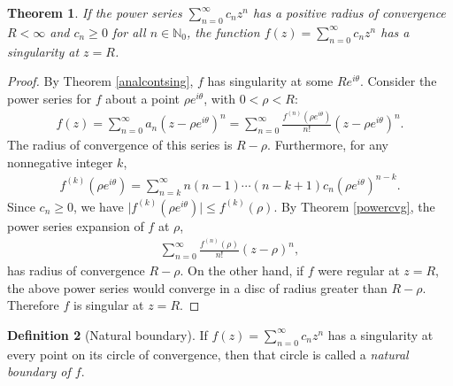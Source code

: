 \documentclass{article}
\numberwithin{equation}{section}
\newcommand{\bbN}{\mathbb{N}}
\theoremstyle{plain}
\newtheorem{theorem}{Theorem}[section]
\theoremstyle{definition}
\newtheorem{definition}[theorem]{Definition}
\begin{document}
\begin{theorem}
If the power series $\sum_{n=0}^\infty c_nz^n$ has a positive radius of convergence $R<\infty$ and $c_n\geq 0$ for all $n\in\bbN_0$, the function $f(z)=\sum_{n=0}^\infty c_nz^n$ has a singularity at $z=R$.
\end{theorem}
\begin{proof}
By Theorem \ref{analcontsing}, $f$ has singularity at some $Re^{i\theta}$. Consider the power series for $f$ about a point $\rho e^{i\theta}$, with $0<\rho<R$:
\begin{align*}
	f(z)=\sum_{n=0}^\infty a_n(z-\rho e^{i\theta})^n=\sum_{n=0}^\infty\frac{f^{(n)}(\rho e^{i\theta})}{n!}(z-\rho e^{i\theta})^n.
\end{align*}
The radius of convergence of this series is $R-\rho$. Furthermore, for any nonnegative integer $k$,
\begin{align*}
	f^{(k)}(\rho e^{i\theta})=\sum_{n=k}^\infty n(n-1)\cdots(n-k+1)c_n(\rho e^{i\theta})^{n-k}.
\end{align*}
Since $c_n\geq 0$, we have $\vert f^{(k)}(\rho e^{i\theta})\vert\leq f^{(k)}(\rho)$. By Theorem \ref{powercvg}, the power series expansion of $f$ at $\rho$,
\begin{align*}
	\sum_{n=0}^\infty\frac{f^{(n)}(\rho)}{n!}(z-\rho)^n,
\end{align*}
has radius of convergence $R-\rho$. On the other hand, if $f$ were regular at $z = R$, the above power series would converge in a disc of radius greater than $R-\rho$. Therefore $f$ is singular at $z=R$.
\end{proof}
\begin{definition}[Natural boundary]
If $f(z)=\sum_{n=0}^\infty c_nz^n$ has a singularity at every point on its circle of convergence, then that circle is called a \textit{natural boundary of $f$}.
\end{definition}
\end{document}
